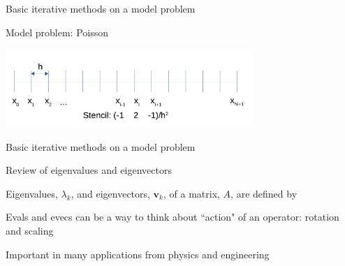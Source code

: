 \documentclass[18pt,xcolor=table]{beamer}
\begin{document}
\begin{frame}{Basic iterative methods on a model problem}
\begin{block}{Model problem: Poisson}
\begin{center}
\includegraphics[width=0.7\textwidth]{../figures/1DFDPoisson}
\end{center}
\end{block}
\end{frame}

\begin{frame}{Basic iterative methods on a model problem}
\begin{block}{Review of eigenvalues and eigenvectors}
\bit
\item Eigenvalues, $\lambda_k$, and eigenvectors, $\mathbf{v}_k$, of a matrix, $A$, are defined by
\item Evals and evecs can be a way to think about ``action" of an operator: rotation and scaling
\item Important in many applications from physics and engineering
\eit
\end{block}
\end{frame}
\end{document}
